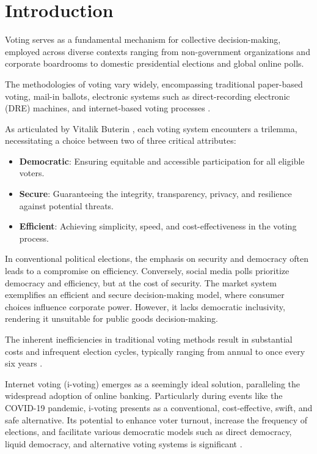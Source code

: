 \documentclass[runningheads]{llncs}
\begin{document}

\section{Introduction}

Voting serves as a fundamental mechanism for collective decision-making, employed across diverse contexts ranging from non-government organizations and corporate boardrooms to domestic presidential elections and global online polls.

The methodologies of voting vary widely, encompassing traditional paper-based voting, mail-in ballots, electronic systems such as direct-recording electronic (DRE) machines, and internet-based voting processes \cite{parkGoingBadWorse2021}.

As articulated by Vitalik Buterin \cite{buterinBlockchainVotingOverrated2021}, each voting system encounters a trilemma, necessitating a choice between two of three critical attributes:

\begin{itemize}
\item \textbf{Democratic}: Ensuring equitable and accessible participation for all eligible voters.
\item \textbf{Secure}: Guaranteeing the integrity, transparency, privacy, and resilience against potential threats.
\item \textbf{Efficient}: Achieving simplicity, speed, and cost-effectiveness in the voting process.
\end{itemize}

In conventional political elections, the emphasis on security and democracy often leads to a compromise on efficiency. Conversely, social media polls prioritize democracy and efficiency, but at the cost of security. The market system exemplifies an efficient and secure decision-making model, where consumer choices influence corporate power. However, it lacks democratic inclusivity, rendering it unsuitable for public goods decision-making.

The inherent inefficiencies in traditional voting methods result in substantial costs and infrequent election cycles, typically ranging from annual to once every six years \cite{buterinBlockchainVotingOverrated2021}.

Internet voting (i-voting) emerges as a seemingly ideal solution, paralleling the widespread adoption of online banking. Particularly during events like the COVID-19 pandemic, i-voting presents as a conventional, cost-effective, swift, and safe alternative. Its potential to enhance voter turnout, increase the frequency of elections, and facilitate various democratic models such as direct democracy, liquid democracy, and alternative voting systems is significant \cite{laslierLoserPluralityVoting2011}.
\end{document}
